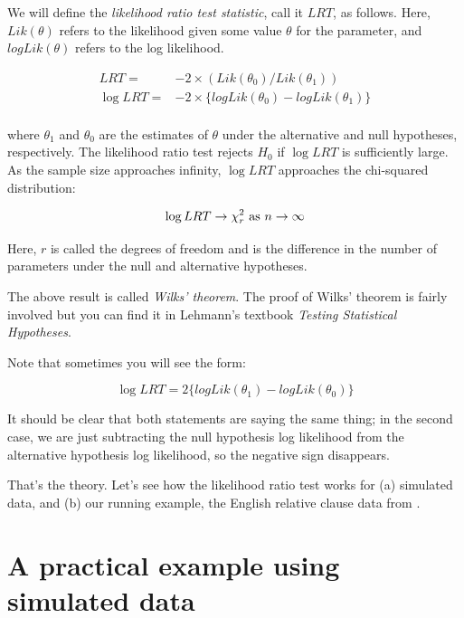 \documentclass[12pt,]{krantz}
\begin{document}
We will define the \emph{likelihood ratio test statistic}, call it \(LRT\), as follows. Here, \(Lik(\theta)\) refers to the likelihood given some value \(\theta\) for the parameter, and
\(logLik(\theta)\) refers to the log likelihood.

\begin{equation}
\begin{split}
LRT =& -2\times (Lik(\theta_0)/Lik(\theta_1)) \\
\log LRT =& -2\times \{logLik(\theta_0)-logLik(\theta_1)\}\\
\end{split}
\end{equation}

where \(\theta_1\) and \(\theta_0\) are the estimates of \(\theta\) under the alternative and null hypotheses, respectively. The likelihood ratio test rejects \(H_0\) if \(\log LRT\) is sufficiently large. As the sample size approaches infinity, \(\log LRT\) approaches the chi-squared distribution:

\begin{equation}
\log LRT \rightarrow \chi_r^2  \hbox{ as }  n \rightarrow \infty
\end{equation}

Here, \(r\) is called the degrees of freedom and is the difference in the number of parameters under the null and alternative hypotheses.

The above result is called \emph{Wilks' theorem}. The proof of Wilks' theorem is fairly involved but you can find it in Lehmann's textbook \emph{Testing Statistical Hypotheses}.

Note that sometimes you will see the form:

\begin{equation}
 \log LRT = 2 \{logLik(\theta_1) - logLik(\theta_0)\}
\end{equation}

It should be clear that both statements are saying the same thing; in the second case, we are just subtracting the null hypothesis log likelihood from the alternative hypothesis log likelihood, so the negative sign disappears.

That's the theory. Let's see how the likelihood ratio test works for (a) simulated data, and (b) our running example, the English relative clause data from \citet{grodner}.

\hypertarget{a-practical-example-using-simulated-data}{%
\section{A practical example using simulated data}\label{a-practical-example-using-simulated-data}}
\end{document}
